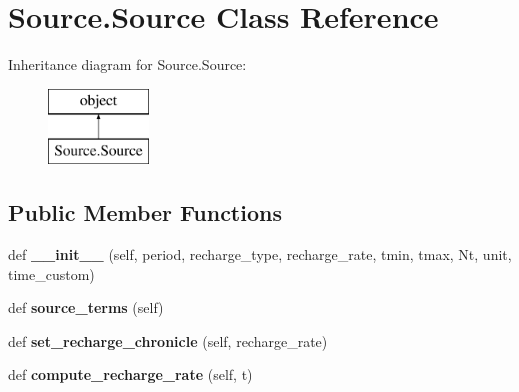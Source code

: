 \hypertarget{class_source_1_1_source}{}\section{Source.\+Source Class Reference}
\label{class_source_1_1_source}
Inheritance diagram for Source.\+Source\+:\begin{figure}[H]
\begin{center}
\leavevmode
\includegraphics[height=2.000000cm]{class_source_1_1_source}
\end{center}
\end{figure}
\subsection*{Public Member Functions}
\begin{DoxyCompactItemize}
\item 
\hypertarget{class_source_1_1_source_a21a8e2f4c830accec0b97c88c5f9cce7}{}\label{class_source_1_1_source_a21a8e2f4c830accec0b97c88c5f9cce7} 
def {\bfseries \+\_\+\+\_\+init\+\_\+\+\_\+} (self, period, recharge\+\_\+type, recharge\+\_\+rate, tmin, tmax, Nt, unit, time\+\_\+custom)
\item 
\hypertarget{class_source_1_1_source_a4f3c35b4a72dae0b6875e0370baaf15b}{}\label{class_source_1_1_source_a4f3c35b4a72dae0b6875e0370baaf15b} 
def {\bfseries source\+\_\+terms} (self)
\item 
\hypertarget{class_source_1_1_source_aa9936919a3ee9ca9e28e85a391c7b9dc}{}\label{class_source_1_1_source_aa9936919a3ee9ca9e28e85a391c7b9dc} 
def {\bfseries set\+\_\+recharge\+\_\+chronicle} (self, recharge\+\_\+rate)
\item 
\hypertarget{class_source_1_1_source_a939a163013d6fc00a64fe365dedadb97}{}\label{class_source_1_1_source_a939a163013d6fc00a64fe365dedadb97} 
def {\bfseries compute\+\_\+recharge\+\_\+rate} (self, t)
\end{DoxyCompactItemize}
